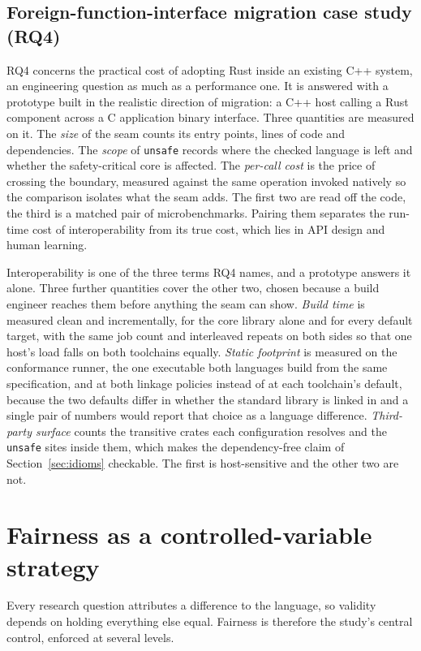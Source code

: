 \documentclass[english,oneside,a4paper,censored,csm,software-track-2020]{HYthesisML}
\begin{document}
\subsection{Foreign-function-interface migration case study (RQ4)}\label{sec:methodffi}
RQ4 concerns the practical cost of adopting Rust inside an existing C++ system, an engineering
question as much as a performance one. It is answered with a prototype built in the realistic
direction of migration: a C++ host calling a Rust component across a C application binary
interface. Three quantities are measured on it. The \emph{size} of the seam counts its entry
points, lines of code and dependencies. The \emph{scope} of \texttt{unsafe} records where the
checked language is left and whether the safety-critical core is affected. The \emph{per-call
cost} is the price of crossing the boundary, measured against the same operation invoked
natively so the comparison isolates what the seam adds. The first two are read off the code, the
third is a matched pair of microbenchmarks. Pairing them separates the run-time cost of
interoperability from its true cost, which lies in API design and human learning.

Interoperability is one of the three terms RQ4 names, and a prototype answers it alone. Three
further quantities cover the other two, chosen because a build engineer reaches them before
anything the seam can show. \emph{Build time} is measured clean and incrementally, for the core
library alone and for every default target, with the same job count and interleaved repeats on both
sides so that one host's load falls on both toolchains equally. \emph{Static footprint} is measured
on the conformance runner, the one executable both languages build from the same specification, and
at both linkage policies instead of at each toolchain's default, because the two defaults differ in
whether the standard library is linked in and a single pair of numbers would report that choice as
a language difference. \emph{Third-party surface} counts the transitive crates each configuration
resolves and the \texttt{unsafe} sites inside them, which makes the dependency-free claim of
Section~\ref{sec:idioms} checkable. The first is host-sensitive and the other two are not.

\section{Fairness as a controlled-variable strategy}\label{sec:controls}
Every research question attributes a difference to the language, so validity depends on holding
everything else equal. Fairness is therefore the study's central control, enforced at several
levels.
\end{document}
